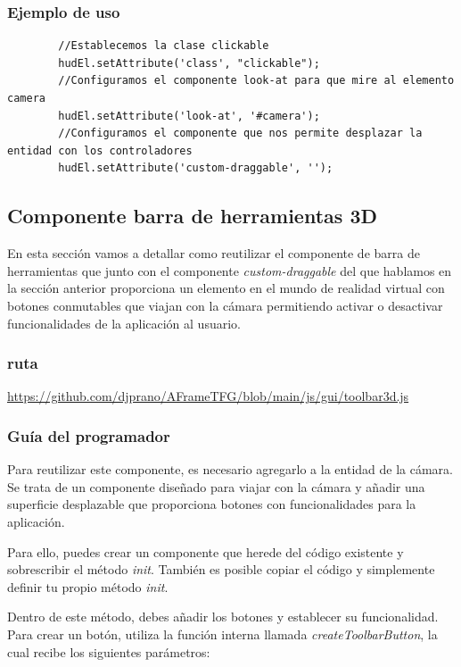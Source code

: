 \documentclass[a4paper, 11pt]{book}
\begin{document}
\subsubsection{Ejemplo de uso}
{\scriptsize
	\begin{verbatim}
		//Establecemos la clase clickable
		hudEl.setAttribute('class', "clickable");
		//Configuramos el componente look-at para que mire al elemento camera
		hudEl.setAttribute('look-at', '#camera');
		//Configuramos el componente que nos permite desplazar la entidad con los controladores
		hudEl.setAttribute('custom-draggable', '');
	\end{verbatim}
}
\subsection{Componente barra de herramientas 3D}
En esta sección vamos a detallar como reutilizar el componente de barra de herramientas que junto con el componente \emph{custom-draggable} del que hablamos en la sección anterior proporciona un elemento en el mundo de realidad virtual con botones conmutables que viajan con la cámara permitiendo activar o desactivar funcionalidades de la aplicación al usuario.
\subsubsection{ruta}
{\scriptsize
	\url{https://github.com/djprano/AFrameTFG/blob/main/js/gui/toolbar3d.js}
}
\subsubsection{Guía del programador}
\label{subsec:guiaBarra3d}
Para reutilizar este componente, es necesario agregarlo a la entidad de la cámara. Se trata de un componente diseñado para viajar con la cámara y añadir una superficie desplazable que proporciona botones con funcionalidades para la aplicación.

Para ello, puedes crear un componente que herede del código existente y sobrescribir el método \emph{init}. También es posible copiar el código y simplemente definir tu propio método \emph{init}.

Dentro de este método, debes añadir los botones y establecer su funcionalidad. Para crear un botón, utiliza la función interna llamada \emph{createToolbarButton}, la cual recibe los siguientes parámetros:
\end{document}
